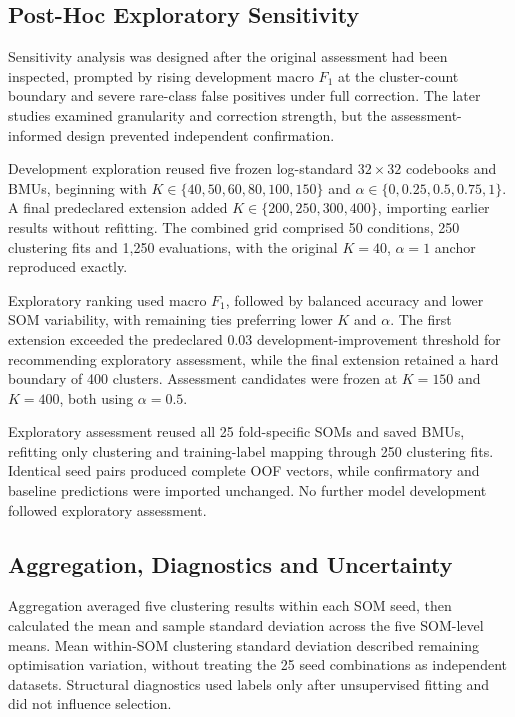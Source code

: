 \subsection{Post-Hoc Exploratory Sensitivity}

Sensitivity analysis was designed after the original assessment had been inspected, prompted by rising development macro $F_1$ at the cluster-count boundary and severe rare-class false positives under full correction. The later studies examined granularity and correction strength, but the assessment-informed design prevented independent confirmation.

Development exploration reused five frozen log-standard $32\times32$ codebooks and BMUs, beginning with $K\in\{40,50,60,80,100,150\}$ and $\alpha\in\{0,0.25,0.5,0.75,1\}$. A final predeclared extension added $K\in\{200,250,300,400\}$, importing earlier results without refitting. The combined grid comprised 50 conditions, 250 clustering fits and 1,250 evaluations, with the original $K=40$, $\alpha=1$ anchor reproduced exactly.

Exploratory ranking used macro $F_1$, followed by balanced accuracy and lower SOM variability, with remaining ties preferring lower $K$ and $\alpha$. The first extension exceeded the predeclared 0.03 development-improvement threshold for recommending exploratory assessment, while the final extension retained a hard boundary of 400 clusters. Assessment candidates were frozen at $K=150$ and $K=400$, both using $\alpha=0.5$.

Exploratory assessment reused all 25 fold-specific SOMs and saved BMUs, refitting only clustering and training-label mapping through 250 clustering fits. Identical seed pairs produced complete OOF vectors, while confirmatory and baseline predictions were imported unchanged. No further model development followed exploratory assessment.

\subsection{Aggregation, Diagnostics and Uncertainty}

Aggregation averaged five clustering results within each SOM seed, then calculated the mean and sample standard deviation across the five SOM-level means. Mean within-SOM clustering standard deviation described remaining optimisation variation, without treating the 25 seed combinations as independent datasets. Structural diagnostics used labels only after unsupervised fitting and did not influence selection.

